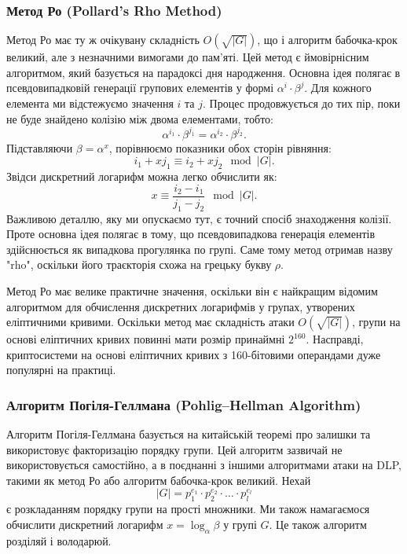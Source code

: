\documentclass[12pt]{report}
\theoremstyle{definition}
\theoremstyle{plain}
\begin{document}
\subsubsection{Метод Ро (Pollard’s Rho Method)}

Метод Ро має ту ж очікувану складність \( O(\sqrt{|G|}) \), що і алгоритм бабочка-крок великий, але з незначними вимогами до пам'яті. Цей метод є ймовірнісним алгоритмом, який базується на парадоксі дня народження. Основна ідея полягає в псевдовипадковій генерації групових елементів у формі \( \alpha^i \cdot \beta^j \). Для кожного елемента ми відстежуємо значення \( i \) та \( j \). Процес продовжується до тих пір, поки не буде знайдено колізію між двома елементами, тобто:
\[
\alpha^{i_1} \cdot \beta^{j_1} = \alpha^{i_2} \cdot \beta^{j_2}.
\]
Підставляючи \( \beta = \alpha^x \), порівнюємо показники обох сторін рівняння:
\[
i_1 + x j_1 \equiv i_2 + x j_2 \mod |G|.
\]
Звідси дискретний логарифм можна легко обчислити як:
\[
x \equiv \frac{i_2 - i_1}{j_1 - j_2} \mod |G|.
\]
Важливою деталлю, яку ми опускаємо тут, є точний спосіб знаходження колізії. Проте основна ідея полягає в тому, що псевдовипадкова генерація елементів здійснюється як випадкова прогулянка по групі. Саме тому метод отримав назву "rho", оскільки його траєкторія схожа на грецьку букву \(\rho\).

Метод Ро має велике практичне значення, оскільки він є найкращим відомим алгоритмом для обчислення дискретних логарифмів у групах, утворених еліптичними кривими. Оскільки метод має складність атаки \( O(\sqrt{|G|}) \), групи на основі еліптичних кривих повинні мати розмір принаймні \( 2^{160} \). Насправді, криптосистеми на основі еліптичних кривих з 160-бітовими операндами дуже популярні на практиці.

\subsubsection{Алгоритм Погіля-Геллмана (Pohlig–Hellman Algorithm)}

Алгоритм Погіля-Геллмана базується на китайській теоремі про залишки та використовує факторизацію порядку групи. Цей алгоритм зазвичай не використовується самостійно, а в поєднанні з іншими алгоритмами атаки на DLP, такими як метод Ро або алгоритм бабочка-крок великий. Нехай
\[
|G| = p_1^{e_1} \cdot p_2^{e_2} \cdot \ldots \cdot p_l^{e_l}
\]
є розкладанням порядку групи на прості множники. Ми також намагаємося обчислити дискретний логарифм \( x = \log_\alpha \beta \) у групі \( G \). Це також алгоритм розділяй і володарюй.
\end{document}
